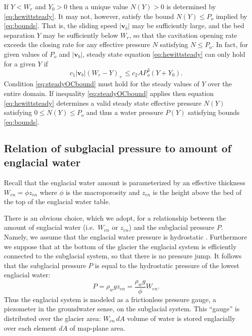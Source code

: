 \documentclass[11pt,final]{amsart}
\newcommand\bv{\mathbf{v}}
\begin{document}
If $Y<W_r$ and $Y_0>0$ then a unique value $N(Y)>0$ is determined by \eqref{eq:hewittsteady}.  It may not, however, satisfy the bound $N(Y) \le P_o$ implied by \eqref{eq:bounds}.  That is, the sliding speed $|\bv_b|$ may be sufficiently large, and the bed separation $Y$ may be sufficiently below $W_r$, so that the cavitation opening rate exceeds the closing rate for any effective pressure $N$ satisfying $N\le P_o$.  In fact, for given values of $P_o$ and $|\bv_b|$, steady state equation \eqref{eq:hewittsteady} can only hold for a given $Y$ if
\begin{equation}
c_1 |\bv_b| (W_r - Y)_+ \le c_2 A P_o^3 (Y+Y_0). \label{eq:steadyOCbound}
\end{equation}
Condition \eqref{eq:steadyOCbound} must hold for the steady values of $Y$ over the entire domain.  If inequality \eqref{eq:steadyOCbound} applies then equation \eqref{eq:hewittsteady} determines a valid steady state effective pressure $N(Y)$ satisfying $0\le N(Y) \le P_o$ and thus a water pressure $P(Y)$ satisfying bounds \eqref{eq:bounds}.

\subsection*{Relation of subglacial pressure to amount of englacial water}  Recall that the englacial water amount is parameterized by an effective thickness $W_{en}=\phi z_{en}$ where $\phi$ is the macroporosity and $z_{en}$ is the height above the bed of the top of the englacial water table.

There is an obvious choice, which we adopt, for a relationship between the amount of englacial water (i.e.~$W_{en}$ or $z_{en}$) and the subglacial pressure $P$.  Namely, we assume that the englacial water pressure is hydrostatic \citep{Bartholomausetal2011}.  Furthermore we suppose that at the bottom of the glacier the englacial system is efficiently connected to the subglacial system, so that there is no pressure jump.  It follows that the subglacial pressure $P$ is equal to the hydrostatic pressure of the lowest englacial water:
\begin{equation}
P = \rho_w g z_{en} = \frac{\rho_w g}{\phi} W_{en}. \label{eq:Penhydrostatic}
\end{equation}
Thus the englacial system is modeled as a frictionless pressure gauge, a piezometer in the groundwater sense, on the subglacial system.  This ``gauge'' is distributed over the glacier area: $W_{en}\, dA$ volume of water is stored englacially over each element $dA$ of map-plane area.
\end{document}
